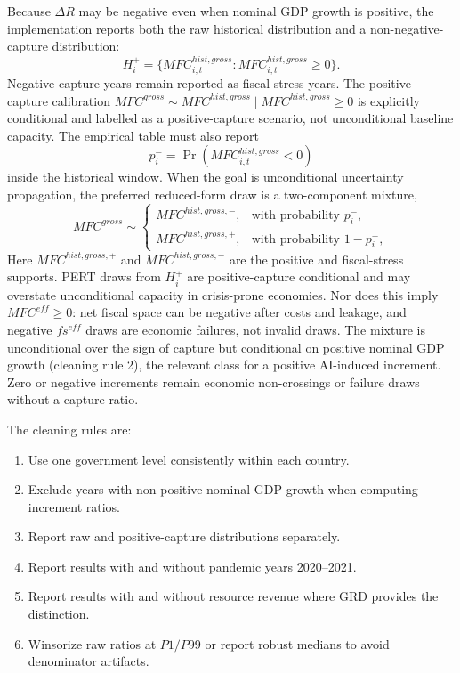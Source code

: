 \documentclass[11pt,a4paper]{article}
\begin{document}
Because $\Delta R$ may be negative even when nominal GDP growth is positive, the implementation reports both the raw historical distribution and a non-negative-capture distribution:
\begin{equation}\label{eq:mfc_hist_positive_v10}
    H_i^+=\{MFC^{hist,gross}_{i,t}:MFC^{hist,gross}_{i,t}\geq0\}.
\end{equation}
Negative-capture years remain reported as fiscal-stress years. The positive-capture calibration $MFC^{gross}\sim MFC^{hist,gross}\mid MFC^{hist,gross}\geq0$ is explicitly conditional and labelled as a positive-capture scenario, not unconditional baseline capacity.
The empirical table must also report
\begin{equation}
    p_i^- = \Pr\left(MFC^{hist,gross}_{i,t}<0\right)
\end{equation}
inside the historical window. When the goal is unconditional uncertainty propagation, the preferred reduced-form draw is a two-component mixture,
\begin{equation}
    MFC^{gross}\sim
    \begin{cases}
    MFC^{hist,gross,-}, & \text{with probability }p_i^-,\\
    MFC^{hist,gross,+}, & \text{with probability }1-p_i^- ,
    \end{cases}
\end{equation}
Here $MFC^{hist,gross,+}$ and $MFC^{hist,gross,-}$ are the positive and fiscal-stress supports. PERT draws from $H_i^+$ are positive-capture conditional and may overstate unconditional capacity in crisis-prone economies. Nor does this imply $MFC^{eff}\geq0$: net fiscal space can be negative after costs and leakage, and negative $fs^{eff}$ draws are economic failures, not invalid draws.
The mixture is unconditional over the sign of capture but conditional on positive nominal GDP growth (cleaning rule 2), the relevant class for a positive AI-induced increment. Zero or negative increments remain economic non-crossings or failure draws without a capture ratio.

The cleaning rules are:
\begin{enumerate}
    \item Use one government level consistently within each country.
    \item Exclude years with non-positive nominal GDP growth when computing increment ratios.
    \item Report raw and positive-capture distributions separately.
    \item Report results with and without pandemic years 2020--2021.
    \item Report results with and without resource revenue where GRD provides the distinction.
    \item Winsorize raw ratios at $P1/P99$ or report robust medians to avoid denominator artifacts.
\end{enumerate}
\end{document}
